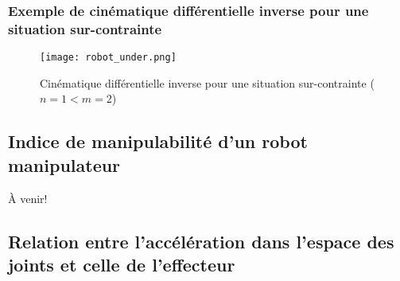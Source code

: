 \subsubsection{Exemple de cinématique différentielle inverse pour une situation sur-contrainte}
\begin{figure}[H]
	\centering
	\texttt{[image: robot\_under.png]}
	\caption{Cinématique différentielle inverse pour une situation sur-contrainte ($n=1<m=2$)}
	\label{fig:robot_under}
\end{figure}



\newpage
\subsection{Indice de manipulabilité d'un robot manipulateur}

À venir!



\newpage
\subsection{Relation entre l'accélération dans l'espace des joints et celle de l'effecteur}
\label{sec:accjointspace}


